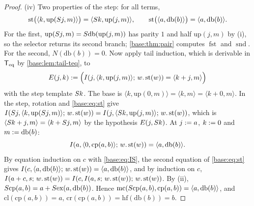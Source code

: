 \begin{proof}
(iv) Two properties of the step: for all terms,
\begin{equation}
 \mathrm{st}\bigl(\langle k,\mathrm{up}(S j,m)\rangle\bigr)
   =\langle S k,\mathrm{up}(j,m)\rangle,\qquad
 \mathrm{st}\bigl(\langle a,\mathrm{db}(b)\rangle\bigr)=\langle a,\mathrm{db}(b)\rangle.
 \label{base:eq:st}
\end{equation}
For the first, $\mathrm{up}(S j,m)=S\mathrm{db}(\mathrm{up}(j,m))$
has parity $1$ and half $\mathrm{up}(j,m)$ by (i), so the selector returns
its second branch; \cref{base:thm:pair} computes $\operatorname{fst}$ and
$\operatorname{snd}$.  For the second, $N(\mathrm{db}(b))=0$.  Now apply
tail induction, which is derivable in $\mathsf{T}_{\mathrm{eq}}$ by \cref{base:lem:tail-teq},
to
\[
 E(j,k)\mathrel{:=}\Bigl(I(j,\langle k,\mathrm{up}(j,m)\rangle;\,w.\,\mathrm{st}(w))
 =\langle k+j,m\rangle\Bigr)
\]
with the step template $S k$.  The base is $\langle k,\mathrm{up}(0,m)\rangle
=\langle k,m\rangle=\langle k+0,m\rangle$.  In the step, rotation and
\eqref{base:eq:st} give
$I(S j,\langle k,\mathrm{up}(S j,m)\rangle;\,w.\,\mathrm{st}(w))=
I(j,\langle S k,\mathrm{up}(j,m)\rangle;\,w.\,\mathrm{st}(w))$, which is
$\langle S k+j,m\rangle=\langle k+S j,m\rangle$ by the hypothesis
$E(j,S k)$.  At $j\mathrel{:=} a$, $k\mathrel{:=} 0$ and $m\mathrel{:=}\mathrm{db}(b)$:
\[
 I(a,\langle 0,\mathrm{cp}(a,b)\rangle;\,w.\,\mathrm{st}(w))
 =\langle a,\mathrm{db}(b)\rangle.
\]
By equation induction on $c$ with \eqref{base:eq:IS}, the second equation
of \eqref{base:eq:st} gives
$I(c,\langle a,\mathrm{db}(b)\rangle;\,w.\,\mathrm{st}(w))=\langle a,\mathrm{db}(b)\rangle$,
and by induction on $c$,
$I(a+c,s;\,w.\,\mathrm{st}(w))=I(c,I(a,s;\,w.\,\mathrm{st}(w));\,w.\,\mathrm{st}(w))$.
By (ii),
$S\mathrm{cp}(a,b)=a+S\mathrm{ex}(a,\mathrm{db}(b))$.  Hence
$\mathrm{mc}(S\mathrm{cp}(a,b),\mathrm{cp}(a,b))=\langle a,\mathrm{db}(b)\rangle$,
and $\mathrm{cl}(\mathrm{cp}(a,b))=a$,
$\mathrm{cr}(\mathrm{cp}(a,b))=\mathrm{hf}(\mathrm{db}(b))=b$.


\end{proof}
